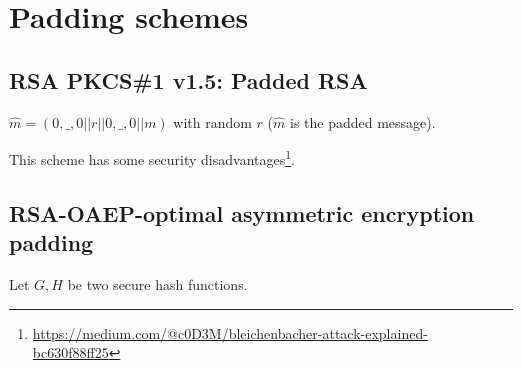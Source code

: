 \documentclass[11pt]{article}
\theoremstyle{definition}
\theoremstyle{proof}
\begin{document}
	\section{Padding schemes}
	
	\subsection{RSA PKCS\#1 v1.5: Padded RSA}
	
	$\hat{m} = (0,\_,0 || r || 0,\_,0 || m)$ with random $r$ ($\hat{m}$ is the padded message).
	
	This scheme has some security disadvantages\footnote{\url{https://medium.com/@c0D3M/bleichenbacher-attack-explained-bc630f88ff25}}.
	
	\subsection{RSA-OAEP-optimal asymmetric encryption padding}
	
	Let $G, H$ be two secure hash functions.
	
\end{document}

